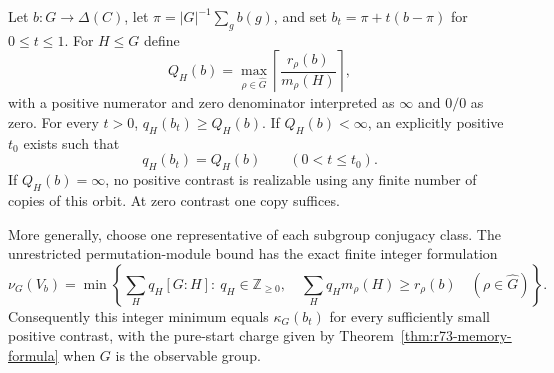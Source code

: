 \begin{theorem}
\label{thm:r75-orbit-multiplicity}
Let $b:G\to\Delta(C)$, let
$\pi=|G|^{-1}\sum_gb(g)$, and set $b_t=\pi+t(b-\pi)$ for $0\le t\le1$.
For $H\le G$ define
\begin{equation}\label{eq:r75-copy-number}
 Q_H(b)=\max_{\rho\in\widehat G}
 \left\lceil\frac{r_\rho(b)}{m_\rho(H)}\right\rceil,
\end{equation}
with a positive numerator and zero denominator interpreted as $\infty$
and $0/0$ as zero. For every $t>0$,
$q_H(b_t)\ge Q_H(b)$. If $Q_H(b)<\infty$, an explicitly positive $t_0$
exists such that
\[
 q_H(b_t)=Q_H(b)\qquad(0<t\le t_0).
\]
If $Q_H(b)=\infty$, no positive contrast is realizable using any finite
number of copies of this orbit. At zero contrast one copy suffices.

More generally, choose one representative of each subgroup conjugacy
class. The unrestricted permutation-module bound has the exact finite
integer formulation
\begin{equation}\label{eq:r75-multiplicity-cover}
 \nu_G(V_b)=
 \min\left\{
  \sum_H q_H[G:H]:\ q_H\in\mathbb Z_{\ge0},\quad
  \sum_Hq_Hm_\rho(H)\ge r_\rho(b)\quad(\rho\in\widehat G)
 \right\}.
\end{equation}
Consequently this integer minimum equals $\kappa_G(b_t)$ for every
sufficiently small positive contrast, with the pure-start charge given
by Theorem~\ref{thm:r73-memory-formula} when $G$ is the observable group.
\end{theorem}
